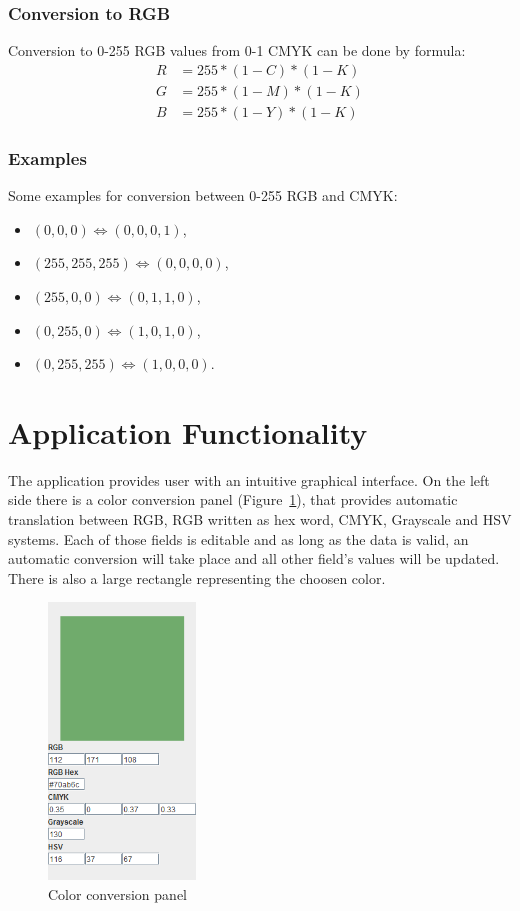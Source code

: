 \documentclass[titlepage]{article}
\begin{document}
\subsubsection{Conversion to RGB}
Conversion to 0-255 RGB values from 0-1 CMYK can be done by formula:
\begin{equation}
\begin{split}
R&=255*(1-C)*(1-K)\\
G&=255*(1-M)*(1-K)\\
B&=255*(1-Y)*(1-K)
\end{split}
\end{equation}

\subsubsection{Examples}
Some examples for conversion between 0-255 RGB and CMYK:
\begin{itemize}
  \item $(0, 0, 0) \Leftrightarrow (0, 0, 0, 1)$,
  \item $(255, 255, 255) \Leftrightarrow (0, 0, 0, 0)$,
  \item $(255, 0, 0) \Leftrightarrow (0, 1, 1, 0)$,
  \item $(0, 255, 0) \Leftrightarrow (1, 0, 1, 0)$,
  \item $(0, 255, 255) \Leftrightarrow (1, 0, 0, 0)$.
\end{itemize}

\clearpage
\section{Application Functionality}
The application provides user with an intuitive graphical interface. On the left side there is a color conversion panel (Figure~\ref{fig:conv}), that provides automatic translation between RGB, RGB written as hex word, CMYK, Grayscale and HSV systems. Each of those fields is editable and as long as the data is valid, an automatic conversion will take place and all other field's values will be updated. There is also a large rectangle representing the choosen color.

\begin{figure}[!htb]
	\centering
	\includegraphics[width=0.35\textwidth]{img/conversion.png} 
	\caption{Color conversion panel}
	\label{fig:conv}
\end{figure}
\end{document}
